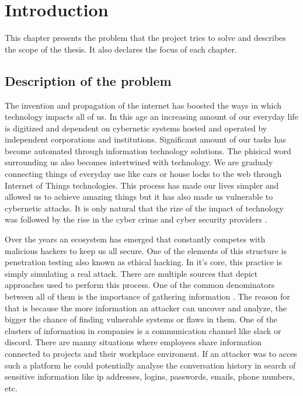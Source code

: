 \documentclass[a4paper,twoside,12pt]{book}
\newcounter{PagesWithoutNumbers}
\begin{document}
\vfill
 
 

\cleardoublepage


\pagestyle{onlyPageNumbers}
\tableofcontents

\setcounter{PagesWithoutNumbers}{\value{page}}
\mainmatter
\pagestyle{PageNumbersChapterTitles}



\chapter{Introduction}

This chapter presents the problem that the project tries to solve and describes the scope of the thesis. It also declares the focus of each chapter.

\section{Description of the problem}

The invention and propagation of the internet has boosted the ways in which technology impacts
all of us. In this age an increasing amount of our everyday life is digitized and dependent 
on cybernetic systems hosted and operated by independent corporations and institutions. Significant
amount of our tasks has become automated through information technology solutions. The phisical word 
surrounding us also becomes intertwined with technology. We are gradualy connecting things of everyday 
use like cars or house locks to the web through Internet of Things technologies. This process has 
made our lives simpler and allowed us to achieve amazing things but it has also made us vulnerable to 
cybernetic attacks. It is only natural that the rize of the impact of technology was followed 
by the rise in the cyber crime and cyber security providers \cite{bib:articleImportanceOfCybersecurity}. 

Over the years an ecosystem has emerged that constantly competes with malicious hackers to keep us all secure.
One of the elements of this structure is penetration testing also known as ethical hacking. In it's core, 
this practice is simply simulating a real attack. There are multiple sources that depict approaches 
used to perform this process. One of the common denominators between all of them is the importance of 
gathering information \cite{bib:bookEthicalHacking}. The reason for that is because the more information an attacker can uncover and analyze, 
the bigger the chance of finding vulnerable systems or flaws in them. One of the clusters of information 
in companies is a communication channel like slack or discord. There are manny situations where employees 
share information connected to projects and their workplace enviroment. If an attacker was to acces such a 
platform he could potentially analyse the conversation history in search of sensitive information like ip addresses, 
logins, passwords, emails, phone numbers, etc.
\end{document}
